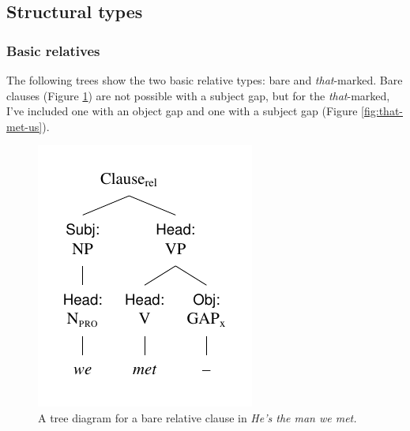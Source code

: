 \subsection{Structural types}
\subsubsection*{Basic relatives}

The following trees show the two basic relative types: bare and \textit{that}-marked. Bare clauses (Figure \ref{fig:we-met}) are not possible with a subject gap, but for the \textit{that}-marked, I've included one with an object gap and one with a subject gap (Figure \ref{fig:that-met-us}).

\begin{figure}[ht]
    \centering
    \includegraphics{figures/we-met.pdf}
    \caption{A tree diagram for a bare relative clause in \textit{He's the man we met.}}
    \label{fig:we-met}
\end{figure}

